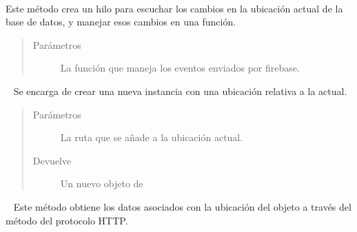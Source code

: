 \begin{fulllineitems}
\label{\detokenize{nao_firebase:firebase.FirebaseDatabase.addeventlistener}}~

Este método crea un hilo para escuchar los cambios en la ubicación actual
de la base de datos, y manejar esos cambios en una función.
\begin{quote}\begin{description}
\item[{Parámetros}] \leavevmode
{} \textendash{} La función que maneja los eventos enviados por firebase.

\end{description}\end{quote}
\end{fulllineitems}

\begin{fulllineitems}
\label{\detokenize{nao_firebase:firebase.FirebaseDatabase.child}}~
Se encarga de crear una nueva instancia con una ubicación relativa a la actual.
\begin{quote}\begin{description}
\item[{Parámetros}] \leavevmode
{} \textendash{} La ruta que se añade a la ubicación actual.

\item[{Devuelve}] \leavevmode
Un nuevo objeto de 

\end{description}\end{quote}

\end{fulllineitems}


\begin{fulllineitems}
\label{\detokenize{nao_firebase:firebase.FirebaseDatabase.get}}~
Este método obtiene los datos asociados con la ubicación del objeto a través
del método  del protocolo HTTP.

\end{fulllineitems}

